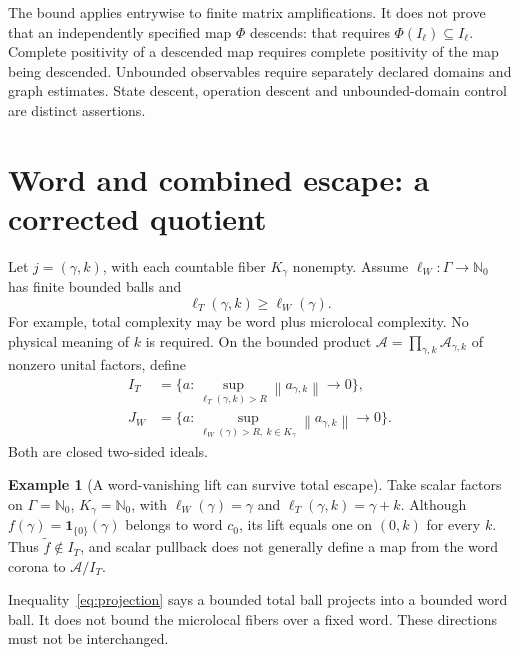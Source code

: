 \documentclass[11pt]{article}
\theoremstyle{definition}
\newtheorem{example}[theorem]{Example}
\newcommand{\N}{\mathbb N_0}
\newcommand{\A}{\mathcal A}
\newcommand{\norm}[1]{\left\lVert#1\right\rVert}
\newcommand{\ind}{\mathbf 1}
\begin{document}
The bound applies entrywise to finite matrix amplifications.
It does not prove that an independently specified map $\Phi$ descends: that requires $\Phi(I_\ell)\subseteq I_\ell$.
Complete positivity of a descended map requires complete positivity of the map being descended.
Unbounded observables require separately declared domains and graph estimates.
State descent, operation descent and unbounded-domain control are distinct assertions.

\section{Word and combined escape: a corrected quotient}
\label{sec:word}

Let $j=(\gamma,k)$, with each countable fiber $K_\gamma$ nonempty.
Assume $\ell_W:\Gamma\to\N$ has finite bounded balls and
\begin{equation}
 \ell_T(\gamma,k)\geq\ell_W(\gamma).
 \label{eq:projection}
\end{equation}
For example, total complexity may be word plus microlocal complexity.
No physical meaning of $k$ is required.
On the bounded product $\A=\prod_{\gamma,k}\A_{\gamma,k}$ of nonzero unital factors, define
\begin{align}
 I_T&=\{a:\sup_{\ell_T(\gamma,k)>R}\norm{a_{\gamma,k}}\to0\},\\
 J_W&=\{a:\sup_{\ell_W(\gamma)>R,\ k\in K_\gamma}
                         \norm{a_{\gamma,k}}\to0\}.
 \label{eq:two-ideals}
\end{align}
Both are closed two-sided ideals.

\begin{example}[A word-vanishing lift can survive total escape]
\label{ex:ray}
Take scalar factors on $\Gamma=\N$, $K_\gamma=\N$, with
$\ell_W(\gamma)=\gamma$ and $\ell_T(\gamma,k)=\gamma+k$.
Although $f(\gamma)=\ind_{\{0\}}(\gamma)$ belongs to word $c_0$, its lift equals one on $(0,k)$ for every $k$.
Thus $\widetilde f\notin I_T$, and scalar pullback does not generally define a map from the word corona to $\A/I_T$.
\end{example}

Inequality~\eqref{eq:projection} says a bounded total ball projects into a bounded word ball.
It does not bound the microlocal fibers over a fixed word.
These directions must not be interchanged.
\end{document}
